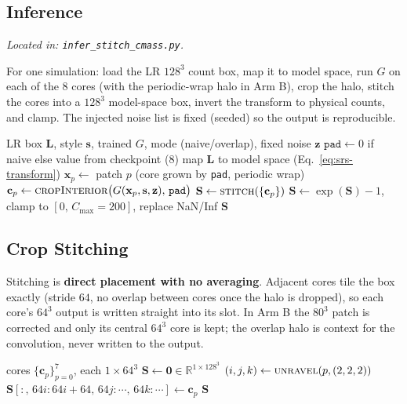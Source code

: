 \subsection{Inference}
\textit{Located in: \texttt{infer\_stitch\_cmass.py}.}

For one simulation: load the LR $128^3$ count box, map it to model space, run $G$
on each of the $8$ cores (with the periodic-wrap halo in Arm B), crop the halo,
stitch the cores into a $128^3$ model-space box, invert the transform to physical
counts, and clamp.  The injected noise list is fixed (seeded) so the output is
reproducible.

\begin{algorithm}[H]
\caption{CMASS inference + stitch (one simulation)}
\label{alg:srs-infer}
\begin{algorithmic}[1]
\Require LR box $\mathbf L$, style $\mathbf s$, trained $G$, mode (naive/overlap), fixed noise $\mathbf z$
\State $\texttt{pad}\gets 0$ if naive else value from checkpoint ($8$)
\State map $\mathbf L$ to model space (Eq.~\ref{eq:srs-transform})
  \State $\mathbf x_p\gets$ patch $p$ (core grown by \texttt{pad}, periodic wrap)
  \State $\mathbf c_p\gets \textsc{cropInterior}\big(G(\mathbf x_p,\mathbf s,\mathbf z),\,\texttt{pad}\big)$ 
\EndFor
\State $\mathbf S\gets \textsc{stitch}(\{\mathbf c_p\})$ 
\State $\mathbf S\gets \exp(\mathbf S)-1$, clamp to $[0,\,C_\text{max}{=}200]$, replace NaN/Inf 
\State \Return $\mathbf S$
\end{algorithmic}
\end{algorithm}

\subsection{Crop Stitching}

Stitching is \textbf{direct placement with no averaging}. Adjacent cores tile the
box exactly (stride $64$, no overlap between cores once the halo is dropped), so
each core's $64^3$ output is written straight into its slot. In Arm B the $80^3$
patch is corrected and only its central $64^3$ core is kept; the overlap halo is
context for the convolution, never written to the output.

\begin{algorithm}[H]
\caption{\textsc{Stitch} ($8$ cores $\to$ $128^3$)}
\label{alg:srs-stitch}
\begin{algorithmic}[1]
\Require cores $\{\mathbf c_p\}_{p=0}^{7}$, each $1\times64^3$
\State $\mathbf S\gets \mathbf 0\in\mathbb R^{1\times128^3}$
  \State $(i,j,k)\gets\textsc{unravel}(p,(2,2,2))$
  \State $\mathbf S[:,\,64i{:}64i{+}64,\,64j{:}\cdots,\,64k{:}\cdots]\gets \mathbf c_p$ 
\EndFor
\State \Return $\mathbf S$
\end{algorithmic}
\end{algorithm}

